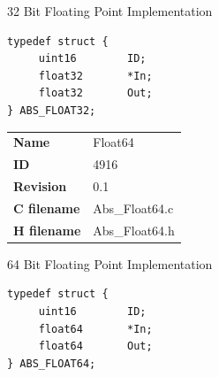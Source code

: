 32 Bit Floating Point Implementation

\begin{lstlisting}
typedef struct {
     uint16        ID;
     float32       *In;
     float32       Out;
} ABS_FLOAT32;
\end{lstlisting}

\ifdefined \AddTestReports
{}
\fi
{}
\nopagebreak[0]
\begin{tabular}{l l}
\textbf{Name} & Float64 \tabularnewline
\textbf{ID} & 4916 \tabularnewline
\textbf{Revision} & 0.1 \tabularnewline
\textbf{C filename} & Abs\_Float64.c \tabularnewline
\textbf{H filename} & Abs\_Float64.h \tabularnewline
\end{tabular}
\vspace{1ex}

64 Bit Floating Point Implementation

\begin{lstlisting}
typedef struct {
     uint16        ID;
     float64       *In;
     float64       Out;
} ABS_FLOAT64;
\end{lstlisting}

\ifdefined \AddTestReports
{}
\fi
